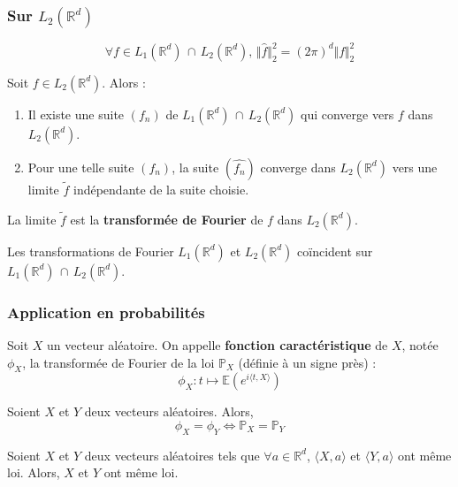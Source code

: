   \subsubsection{Sur \texorpdfstring{$L_2(\mathbb{R}^d)$}{Rᵈ}}

  \begin{theorem}
    \[ \forall f \in L_1(\mathbb{R}^d) \, \cap \, L_2(\mathbb{R}^d), \, \Vert \widehat{f} \Vert^2_2 = (2 \pi)^d \Vert f \Vert^2_2 \]
  \end{theorem}

  \begin{theorem}
    Soit $f \in L_2(\mathbb{R}^d)$. Alors :
    \begin{enumerate}[label={\bfseries(\roman*)}]
      \item Il existe une suite $(f_n)$ de $L_1(\mathbb{R}^d) \, \cap \, L_2(\mathbb{R}^d)$ qui converge vers $f$ dans $L_2(\mathbb{R}^d)$.
      \item Pour une telle suite $(f_n)$, la suite $(\widehat{f_n})$ converge dans $L_2(\mathbb{R}^d)$ vers une limite $\widetilde{f}$ indépendante de la suite choisie.
    \end{enumerate}
  \end{theorem}

  \begin{definition}
    La limite $\widetilde{f}$ est la \textbf{transformée de Fourier} de $f$ dans $L_2(\mathbb{R}^d)$.
  \end{definition}

  \begin{proposition}
    Les transformations de Fourier $L_1(\mathbb{R}^d)$ et $L_2(\mathbb{R}^d)$ coïncident sur $L_1(\mathbb{R}^d) \, \cap \, L_2(\mathbb{R}^d)$.
  \end{proposition}

  \subsubsection{Application en probabilités}


  \begin{definition}
    Soit $X$ un vecteur aléatoire. On appelle \textbf{fonction caractéristique} de $X$, notée $\phi_X$, la transformée de Fourier de la loi $\mathbb{P}_X$ (définie à un signe près) :
    \[ \phi_X : t \mapsto \mathbb{E}(e^{i \langle t, X \rangle}) \]
  \end{definition}

  \begin{theorem}
    Soient $X$ et $Y$ deux vecteurs aléatoires. Alors,
    \[ \phi_X = \phi_Y \iff \mathbb{P}_X = \mathbb{P}_Y \]
  \end{theorem}

  \begin{corollary}
    Soient $X$ et $Y$ deux vecteurs aléatoires tels que $\forall a \in \mathbb{R}^d$, $\langle X, a \rangle$ et $\langle Y, a \rangle$ ont même loi. Alors, $X$ et $Y$ ont même loi.
  \end{corollary}

